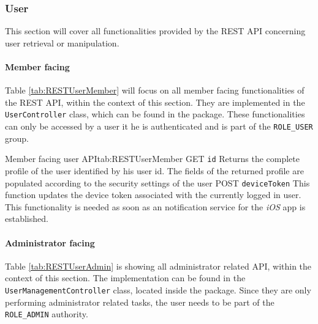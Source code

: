 \subsubsection{User}
This section will cover all functionalities provided by the \gls{REST} \gls{API} concerning user retrieval or manipulation.

\paragraph{Member facing}

Table \vref{tab:RESTUserMember} will focus on all member facing functionalities of the \gls{REST} \gls{API}, within the context of this section. They are implemented in the \texttt{UserController} class, which can be found in the  package. These functionalities can only be accessed by a user it he is authenticated and is part of the \texttt{ROLE\_USER} group.

\begin{RESTTable}{Member facing user API}{tab:RESTUserMember}
		{GET}
		{\texttt{id}}
		{Returns the complete profile of the user identified by his user id. The fields of the returned profile are populated according to the security settings of the user}
		{POST}
		{\texttt{deviceToken}}
		{This function updates the device token associated with the currently logged in user. This functionality is needed as soon as an notification service for the \emph{iOS} app is established. }
\end{RESTTable}

\paragraph{Administrator facing}

Table \vref{tab:RESTUserAdmin} is showing all administrator related \gls{API}, within the context of this section. The implementation can be found in the \texttt{UserManagementController} class, located inside the  package. Since they are only performing administrator related tasks, the user needs to be part of the \texttt{ROLE\_ADMIN} authority.

